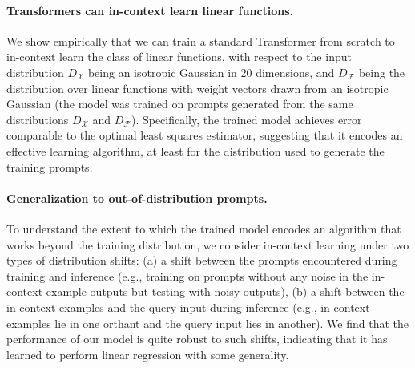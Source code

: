 

\paragraph{Transformers can in-context learn linear functions.}
We show empirically that we can train a standard Transformer from scratch to in-context learn the class of linear functions, with respect to
the input distribution $D_{\mathcal{X}}$ being an isotropic Gaussian in 20 dimensions, and  $D_{\mathcal{F}}$ being the distribution over linear functions with weight vectors drawn from an isotropic Gaussian (the model was trained on prompts generated from the same distributions $D_{\mathcal{X}}$ and $D_{\mathcal{F}}$).
Specifically, the trained model achieves error comparable to the optimal least squares estimator, suggesting that it encodes an effective learning algorithm, at least for the distribution used to generate the training prompts.

\paragraph{Generalization to out-of-distribution prompts.}
To understand the extent to which the trained model encodes an algorithm that works beyond the training distribution, we consider in-context learning under two types of distribution shifts: (a) a shift between the prompts encountered during training and inference (e.g., training on prompts without any noise in the in-context example outputs but testing with noisy outputs), (b) a shift between the in-context examples and the query input during inference (e.g., in-context examples lie in one orthant and the query input lies in another). 
We find that the  performance of our model is quite robust to such shifts, indicating that it has learned to perform linear regression with some generality.

